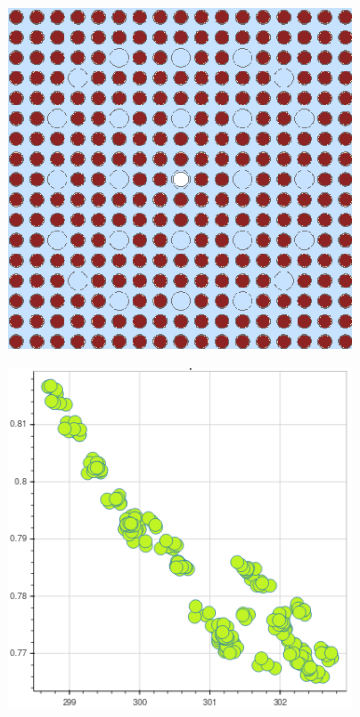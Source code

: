 \begin{figure}[h!]
\centering
\begin{subfigure}{0.42\textwidth}
  \centering
  \includegraphics[width=0.8\linewidth]{figures/unsupervised/features/assm-16/geometry}
  \caption{}
  \label{fig:chap10-fiss-mean-spect-ind-geom}
\end{subfigure}%
\begin{subfigure}{0.45\textwidth}
  \centering
  \includegraphics[width=0.9\linewidth]{figures/unsupervised/features/assm-16/u235-fiss/mean-spect-ind-sum/mgxs}

\end{subfigure}
\end{figure}
